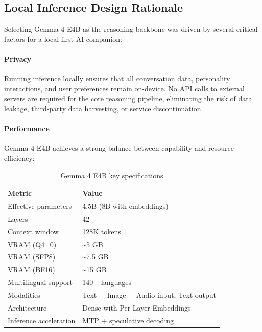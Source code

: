 \documentclass[sigconf]{acmart}
\begin{document}
\subsection{Local Inference Design Rationale}\label{sec:ollama}

Selecting Gemma 4 E4B as the reasoning backbone was driven by several critical factors for a local-first AI companion:

\paragraph{Privacy} Running inference locally ensures that all conversation data, personality interactions, and user preferences remain on-device. No API calls to external servers are required for the core reasoning pipeline, eliminating the risk of data leakage, third-party data harvesting, or service discontinuation.

\paragraph{Performance} Gemma 4 E4B achieves a strong balance between capability and resource efficiency:

\begin{table}[htbp]
    \centering
    \caption{Gemma 4 E4B key specifications}
    \label{tab:gemma4specs}
    \begin{tabular}{@{}ll@{}}
        \toprule
        \textbf{Metric} & \textbf{Value} \\
        \midrule
        Effective parameters & 4.5B (8B with embeddings) \\
        Layers & 42 \\
        Context window & 128K tokens \\
        VRAM (Q4\_0) & \textasciitilde 5 GB \\
        VRAM (SFP8) & \textasciitilde 7.5 GB \\
        VRAM (BF16) & \textasciitilde 15 GB \\
        Multilingual support & 140+ languages \\
        Modalities & Text + Image + Audio input, Text output \\
        Architecture & Dense with Per-Layer Embeddings \\
        Inference acceleration & MTP + speculative decoding \\
        \bottomrule
    \end{tabular}
\end{table}
\end{document}

